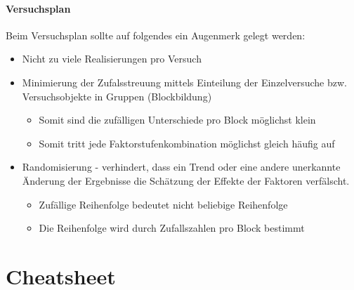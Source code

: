 \subsection{Versuchsplan}
Beim Versuchsplan sollte auf folgendes ein Augenmerk gelegt werden:
\begin{itemize}
    \item Nicht zu viele Realisierungen pro Versuch
    \item Minimierung der Zufalsstreuung mittels Einteilung der Einzelversuche bzw. Versuchsobjekte in Gruppen (Blockbildung)
    \begin{itemize}
        \item Somit sind die zufälligen Unterschiede pro Block möglichst klein
        \item Somit tritt jede Faktorstufenkombination möglichst gleich häufig auf
    \end{itemize}
    \item Randomisierung - verhindert, dass ein Trend oder eine andere unerkannte Änderung der Ergebnisse die Schätzung der Effekte der Faktoren verfälscht. 
    \begin{itemize}
        \item Zufällige Reihenfolge bedeutet nicht beliebige Reihenfolge 
        \item Die Reihenfolge wird durch Zufallszahlen pro Block bestimmt 
    \end{itemize}
    
    
\end{itemize}


\part{Cheatsheet}

